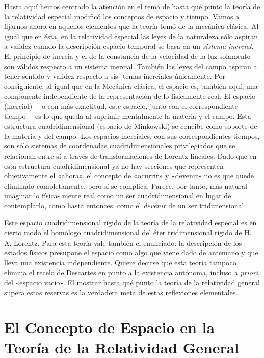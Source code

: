\documentclass[spanish]{book}
\begin{document}
Hasta aquí hemos centrado la atención en el tema de hasta qué punto la teoría de la
relatividad especial modificó los conceptos de espacio y tiempo. Vamos a fijarnos
ahora en aquellos elementos que la teoría tomó de la mecánica clásica. Al igual que en
ésta, en la relatividad especial las leyes de la naturaleza sólo aspiran a validez cuando la
descripción espacio-temporal se basa en un \textit{sistema inercial}. El principio de inercia y el
de la constancia de la velocidad de la luz solamente son válidos respecto a un sistema
inercial. También las leyes del campo aspiran a tener sentido y validez respecto a sis-
temas inerciales únicamente. Por consiguiente, al igual que en la Mecánica clásica, el
espacio es, también aquí, una componente independiente de la representación de lo
físicamente real. El espacio (inercial) —o con más exactitud, este espacio, junto con el
correspondiente tiempo— es lo que queda al suprimir mentalmente la materia y el
campo. Esta estructura cuadridimensional (espacio de Minkowski) se concibe como
soporte de la materia y del campo. Los espacios inerciales, con sus correspondientes
tiempos, son sólo sistemas de coordenadas cuadridimensionales privilegiados que se
relacionan entre sí a través de transformaciones de Lorentz lineales. Dado que en esta
estructura cuadridimensional ya no hay secciones que representen objetivamente el
«ahora», el concepto de «ocurrir» y «devenir» no es que quede eliminado
completamente, pero sí se complica. Parece, por tanto, más natural imaginar lo física-
mente real como un ser cuadridimensional en lugar de contemplarlo, como hasta
entonces, como el \textit{devenir} de un ser tridimensional.

Este espacio cuadridimensional rígido de la teoría de la relatividad especial es en
cierto modo el homólogo cuadridimensional del éter tridimensional rígido de H. A.
Lorentz. Para esta teoría vale también el enunciado: la descripción de los estados físicos
presupone el espacio como algo que viene dado de antemano y que lleva una existencia
independiente. Quiere decirse que esta teoría tampoco elimina el recelo de Descartes
en punto a la existencia autónoma, incluso \textit{a priori}, del «espacio vacío». El mostrar
hasta qué punto la teoría de la relatividad general supera estas reservas es la verdadera
meta de estas reflexiones elementales.

\section{El Concepto de Espacio en la Teoría de la Relatividad General}
\end{document}
